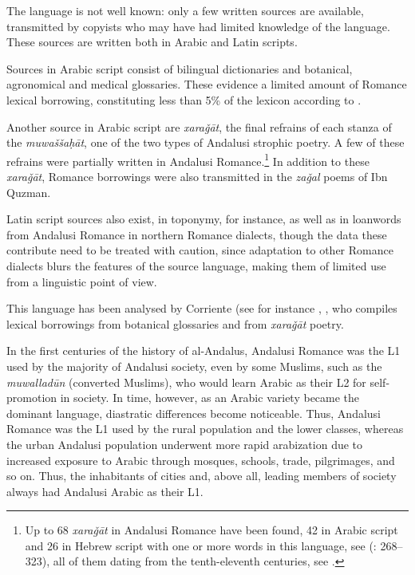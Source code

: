 \documentclass[output=paper,modfonts,nonflat]{langsci/langscibook}
\begin{document}
The language is not well known: only a few written sources are available, transmitted by copyists who may have had limited knowledge of the language. These sources are written both in Arabic and Latin scripts. 

Sources in Arabic script consist of bilingual dictionaries and botanical, agronomical and medical glossaries. These evidence a limited amount of Romance lexical borrowing, constituting less than 5\% of the lexicon according to \citep[142]{Corriente1992}.

Another source in Arabic script are \textit{xaraǧāt}, the final refrains of each stanza of the \textit{muwaššaḥāt}, one of the two types of Andalusi strophic poetry. A few of these refrains were partially written in Andalusi Romance.\footnote{Up to 68 \textit{xaraǧāt} in Andalusi Romance have been found, 42 in Arabic script and 26 in Hebrew script with one or more words in this language, see (\citealt{Corriente1997a}: 268–323), all of them dating from the tenth-eleventh centuries, see \citep[343]{Corriente1997a}.} In addition to these \textit{xaraǧāt}, Romance borrowings were also transmitted in the \textit{zaǧal} poems of Ibn Quzman. 

Latin script sources also exist, in toponymy, for instance, as well as in loanwords from Andalusi Romance in northern Romance dialects, though the data these contribute need to be treated with caution, since adaptation to other Romance dialects blurs the features of the source language, making them of limited use from a linguistic point of view. 

This language has been analysed by Corriente (see for instance \citep{Corriente1995}, \citep{Corriente2000}, \citep{Corriente2012} who compiles lexical borrowings from botanical glossaries and from \textit{xaraǧāt} poetry.  

In the first centuries of the history of al-Andalus, Andalusi Romance was the L1 used by the majority of Andalusi society, even by some Muslims, such as the \textit{muwalladūn} (converted Muslims), who would learn Arabic as their L2 for self-promotion in society. In time, however, as an Arabic variety became the dominant language, diastratic differences become noticeable. Thus, Andalusi Romance was the L1 used by the rural population and the lower classes, whereas the urban Andalusi population underwent more rapid arabization due to increased exposure to Arabic through mosques, schools, trade, pilgrimages, and so on. Thus, the inhabitants of cities and, above all, leading members of society always had Andalusi Arabic as their L1. 
\end{document}
